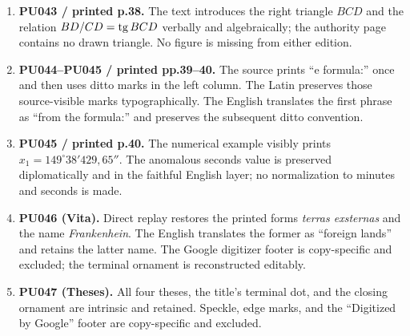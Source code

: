 \documentclass[10pt]{article}
\begin{document}
\begin{enumerate}
\item[16.] \textbf{PU043 / printed p.38.} The text introduces the right triangle $BCD$ and the relation $BD/CD=\operatorname{tg} BCD$ verbally and algebraically; the authority page contains no drawn triangle. No figure is missing from either edition.

\item[17.] \textbf{PU044--PU045 / printed pp.39--40.} The source prints ``e formula:'' once and then uses ditto marks in the left column. The Latin preserves those source-visible marks typographically. The English translates the first phrase as ``from the formula:'' and preserves the subsequent ditto convention.

\item[18.] \textbf{PU045 / printed p.40.} The numerical example visibly prints $x_1=149^\circ38'429{,}65''$. The anomalous seconds value is preserved diplomatically and in the faithful English layer; no normalization to minutes and seconds is made.

\item[19.] \textbf{PU046 (Vita).} Direct replay restores the printed forms \emph{terras exsternas} and the name \emph{Frankenhein}. The English translates the former as ``foreign lands'' and retains the latter name. The Google digitizer footer is copy-specific and excluded; the terminal ornament is reconstructed editably.

\item[20.] \textbf{PU047 (Theses).} All four theses, the title's terminal dot, and the closing ornament are intrinsic and retained. Speckle, edge marks, and the ``Digitized by Google'' footer are copy-specific and excluded.
\end{enumerate}
\end{document}
